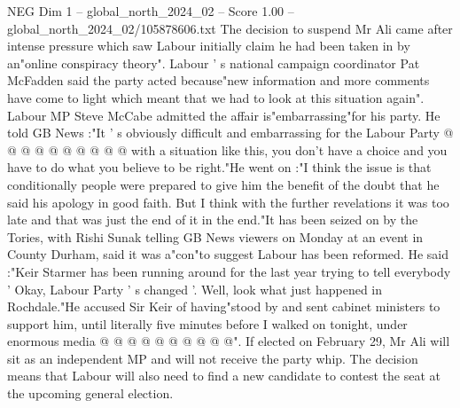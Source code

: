 \begin{textsample}{NEG Dim 1 – global\_north\_2024\_02 – Score 1.00 – global\_north\_2024\_02/105878606.txt}
The decision to suspend Mr Ali came after intense pressure which saw Labour initially claim he had been taken in by an"online conspiracy theory".
Labour ' s national campaign coordinator Pat McFadden said the party acted because"new information and more comments have come to light which meant that we had to look at this situation again".
Labour MP Steve McCabe admitted the affair is"embarrassing"for his party.
He told GB News :"It ' s obviously difficult and embarrassing for the Labour Party @ @ @ @ @ @ @ @ @ @ with a situation like this, you don't have a choice and you have to do what you believe to be right."He went on :"I think the issue is that conditionally people were prepared to give him the benefit of the doubt that he said his apology in good faith.
But I think with the further revelations it was too late and that was just the end of it in the end."It has been seized on by the Tories, with Rishi Sunak telling GB News viewers on Monday at an event in County Durham, said it was a"con"to suggest Labour has been reformed.
He said :"Keir Starmer has been running around for the last year trying to tell everybody ' Okay, Labour Party ' s changed '.
Well, look what just happened in Rochdale."He accused Sir Keir of having"stood by and sent cabinet ministers to support him, until literally five minutes before I walked on tonight, under enormous media @ @ @ @ @ @ @ @ @ @".
If elected on February 29, Mr Ali will sit as an independent MP and will not receive the party whip.
The decision means that Labour will also need to find a new candidate to contest the seat at the upcoming general election.

\end{textsample}
